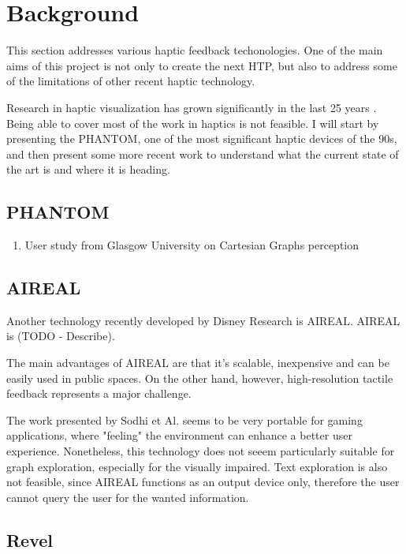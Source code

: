 \chapter*{Background}

This section addresses various haptic feedback techonologies. One of the main aims of this project is not only to create the next HTP, but also to address some of the limitations of other recent haptic technology. 

Research in haptic visualization has grown significantly in the last 25 years \cite{roberts2007we}. Being able to cover most of the work in haptics is not feasible. I will start by presenting the PHANTOM, one of the most significant haptic devices of the 90s, and then present some more recent work to understand what the current state of the art is and where it is heading. 

\section*{PHANTOM}

\begin{enumerate}
	\item User study from Glasgow University on Cartesian Graphs perception
\end{enumerate}
  
\section*{AIREAL}

Another technology recently developed by Disney Research is AIREAL. AIREAL is (TODO - Describe). 

The main advantages of AIREAL are that it's scalable, inexpensive and can be easily used in public spaces. On the other hand, however, high-resolution tactile feedback represents a major challenge. 

The work presented by Sodhi et Al. seems to be very portable for gaming applications, where "feeling" the environment can enhance a better user experience. Nonetheless, this technology does not seeem particularly suitable for graph exploration, especially for the visually impaired. Text exploration is also not feasible, since AIREAL functions as an output device only, therefore the user cannot query the user for the wanted information.

\section*{Revel}

